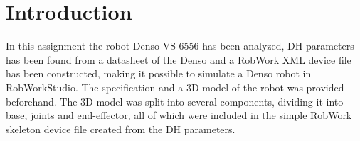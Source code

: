 \section{Introduction}

In this assignment the robot Denso VS-6556 has been analyzed, DH parameters has been found from a datasheet of the Denso and a RobWork XML device file has been constructed, making it possible to simulate a Denso robot in RobWorkStudio. The specification and a 3D model of the robot was provided beforehand. The 3D model was split into several components, dividing it into base, joints and end-effector, all of which were included in the simple RobWork skeleton device file created from the DH parameters.
